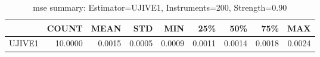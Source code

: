 \begin{table}[ht]
\centering
\caption{mse summary: Estimator=UJIVE1, Instruments=200, Strength=0.90}
\begin{tabular}{lrrrrrrrr}
\toprule
 & COUNT & MEAN & STD & MIN & 25\% & 50\% & 75\% & MAX \\
\midrule
UJIVE1 & 10.0000 & 0.0015 & 0.0005 & 0.0009 & 0.0011 & 0.0014 & 0.0018 & 0.0024 \\
\bottomrule
\end{tabular}
\end{table}
